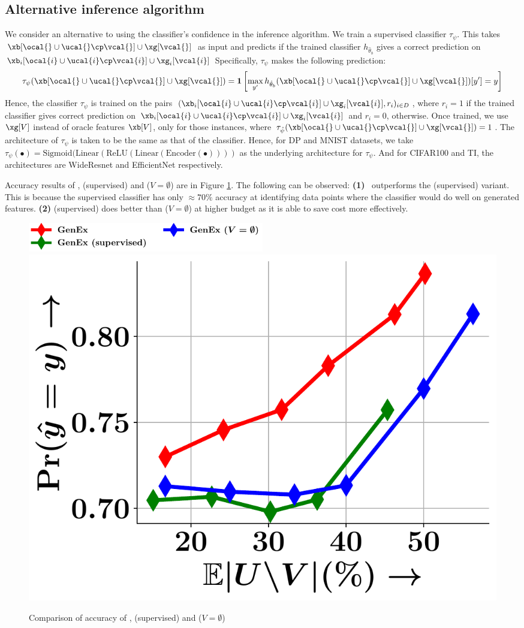 \documentclass[letterpaper]{article}
\begin{document}
\subsection{Alternative inference algorithm}
We consider an alternative to using the classifier's confidence in the inference algorithm. We train a supervised classifier $\tau_{\psi}$. This takes $\xb[\ocal{} \cup \ucal{}\cp\vcal{}]\cup \xg[\vcal{}]$   as input and  predicts if the trained classifier $  h_{\hat{\theta}_b}$ gives a correct prediction on $\xb_i[\ocal{i} \cup \ucal{i}\cp\vcal{i}]\cup \xg_i[\vcal{i}]$
Specifically, $\tau_{\psi}$ makes the following prediction:
\begin{align}
\tau_{\psi}(\xb[\ocal{} \cup \ucal{}\cp\vcal{}]\cup \xg[\vcal{}]) = \mathbf{1}\left[\max_{y'}   h_{\hat{\theta}_b}(\xb[\ocal{} \cup \ucal{}\cp\vcal{}]\cup \xg[\vcal{}])[y']=y\right] 
\end{align}
Hence, the classifier $\tau_{\psi}$ is trained 
on the pairs $(\xb_i[\ocal{i} \cup \ucal{i}\cp\vcal{i}]\cup \xg_i[\vcal{i}], r_i)_{i\in D}$, where $r_i = 1$ if the trained classifier gives correct prediction on $\xb_i[\ocal{i} \cup \ucal{i}\cp\vcal{i}]\cup \xg_i[\vcal{i}]$ and $r_i =0$, otherwise. Once trained,  we use $\xg[V]$ instead of oracle features $\xb[V]$, only for those instances, where $\tau_{\hat{\psi}}(\xb[\ocal{} \cup \ucal{}\cp\vcal{}]\cup \xg[\vcal{}]) =1$. The architecture of $\tau_{\psi}$ is taken to be the same as that of the classifier. Hence, for DP and MNIST datasets, we take $\tau_{\psi} (\bullet) =  \text{Sigmoid}(\text{Linear}(\text{ReLU} (\text{Linear}(\text{Encoder}(\bullet))))$ as the underlying architecture for $\tau_{\psi}$. And for CIFAR100 and TI, the architectures are WideResnet and EfficientNet respectively.

 Accuracy results of \our, \our(supervised) and \our($V=\emptyset$) are in Figure \ref{fig:choice_dp}. The following can be observed: \textbf{(1)} \our\ outperforms the \our(supervised) variant. This is because the supervised classifier has only $\approx 70 \%$ accuracy at identifying data points where the classifier would do well on generated features. \textbf{(2)} \our(supervised) does better than \our($V=\emptyset$) at higher budget as it is able to save cost more effectively.
\begin{figure}[h]
    \centering
      \includegraphics[width=0.5\textwidth]{FIG/legend_choice.pdf}\\[-0.5ex]
\includegraphics[width=.3\textwidth]{FIG/choice_dp.pdf}
\caption{\small Comparison of accuracy of \our, \our(supervised) and \our($V=\emptyset$)}
\label{fig:choice_dp}
\end{figure}
\end{document}
